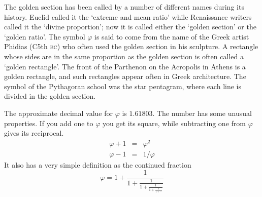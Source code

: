 \documentclass[10pt,letterpaper,extrafontsizes]{memoir}
\begin{document}
    The golden section has been called by a number of different names
during its history. Euclid
 called it the `extreme and mean ratio' while
Renaissance writers called it the `divine proportion'; now it is
called either the `golden section' or the `golden ratio'. The symbol
$\varphi$ is said to come from the name of the Greek artist 
Phidias
(C5th \textsc{bc}) who often used the golden section in his sculpture.
A rectangle whose sides are in the same proportion as the golden section
is often called a `golden rectangle'.
The front of the Parthenon on the Acropolis in Athens is a golden rectangle,
and such rectangles appear often in Greek architecture.
The symbol of the Pythagoran school was the star pentagram, 
where each line is divided in the golden section.


    The approximate decimal value for $\varphi$ is $1.61803$. 
The number has some unusual properties. If you add one to $\varphi$
you get its square, while subtracting one from $\varphi$ gives its 
reciprocal.
\begin{eqnarray}
  \varphi + 1 & = & \varphi^{2} \\
  \varphi - 1 & = & 1/\varphi
\end{eqnarray}
It also has a very simple definition as the continued fraction
\begin{equation}
\varphi = 1 + \frac{1}{\displaystyle 1 + \frac{1}{\displaystyle 1 + \frac{1}{\displaystyle 1 + \frac{1}{1 + \cdots}}}}
\end{equation}
\end{document}
